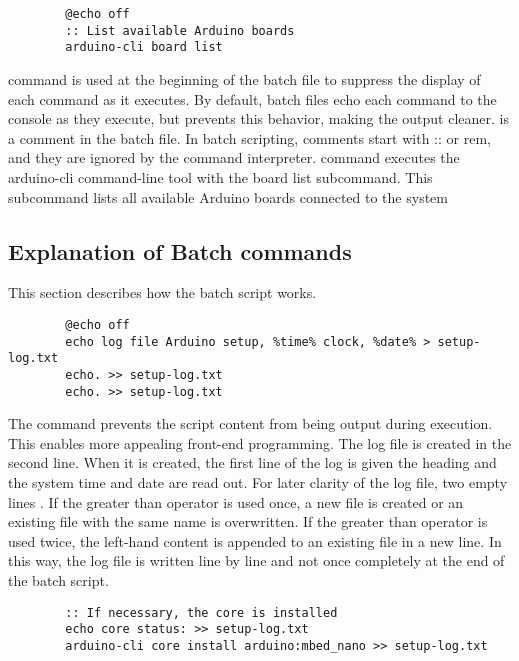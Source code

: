 \begin{center}
    \begin{lstlisting}
        @echo off
        :: List available Arduino boards
        arduino-cli board list
    \end{lstlisting}
\end{center}

 command is used at the beginning of the batch file to suppress the display of each command as it executes. By default, batch files echo each command to the console as they execute, but  prevents this behavior, making the output cleaner. 
 is a comment in the batch file. In batch scripting, comments start with :: or rem, and they are ignored by the command interpreter.
 command executes the arduino-cli command-line tool with the board list subcommand. This subcommand lists all available Arduino boards connected to the system

\subsection{Explanation of Batch commands}

This section describes how the batch script works.

{\small 
    \begin{lstlisting}
        @echo off
        echo log file Arduino setup, %time% clock, %date% > setup-log.txt
        echo. >> setup-log.txt
        echo. >> setup-log.txt
    \end{lstlisting}
}

The command  prevents the script content from being output during execution. This enables more appealing front-end programming. The log file is created in the second line. When it is created, the first line of the log is given the heading  and the system time  and date  are read out. For later clarity of the log file, two empty lines . If the greater than operator  is used once, a new file is created or an existing file with the same name is overwritten. If the greater than operator  is used twice, the left-hand content is appended to an existing file in a new line. In this way, the log file is written line by line and not once completely at the end of the batch script.

\begin{center}
    \begin{lstlisting}
        :: If necessary, the core is installed
        echo core status: >> setup-log.txt
        arduino-cli core install arduino:mbed_nano >> setup-log.txt
    \end{lstlisting}
\end{center}

